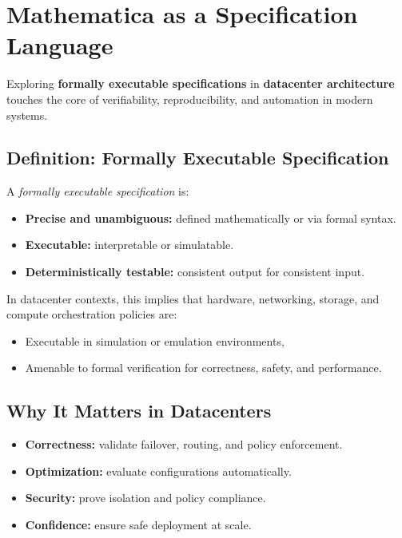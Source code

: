 \section{Mathematica as a Specification Language}

Exploring \textbf{formally executable specifications} in \textbf{datacenter architecture} touches the core of verifiability, reproducibility, and automation in modern systems.

\subsection*{Definition: Formally Executable Specification}

\begin{marginfigure}
\small
A \emph{formally executable specification} is:
\begin{itemize}[leftmargin=*]
  \item \textbf{Precise and unambiguous:} defined mathematically or via formal syntax.
  \item \textbf{Executable:} interpretable or simulatable.
  \item \textbf{Deterministically testable:} consistent output for consistent input.
\end{itemize}
\end{marginfigure}

In datacenter contexts, this implies that hardware, networking, storage, and compute orchestration policies are:
\begin{itemize}
  \item Executable in simulation or emulation environments,
  \item Amenable to formal verification for correctness, safety, and performance.
\end{itemize}

\subsection*{Why It Matters in Datacenters}

\begin{itemize}
  \item \textbf{Correctness:} validate failover, routing, and policy enforcement.
  \item \textbf{Optimization:} evaluate configurations automatically.
  \item \textbf{Security:} prove isolation and policy compliance.
  \item \textbf{Confidence:} ensure safe deployment at scale.
\end{itemize}

